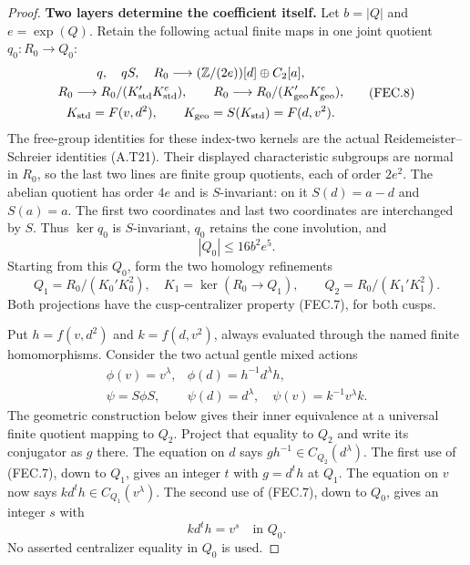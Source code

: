 \begin{proof}
\par\medskip\noindent\textbf{Two layers determine the coefficient itself.}\quad
Let $b=|Q|$ and $e=\exp(Q)$.  Retain the following actual
finite maps in one joint quotient $q_0:R_0\to Q_0$:
\[
 \begin{gathered}
 q,\quad qS,\quad
 R_0\longrightarrow(\mathbb Z/(2e))[d]\oplus C_2[a],\\
 R_0\longrightarrow R_0/(K_{\rm std}'K_{\rm std}^{e}),\qquad
 R_0\longrightarrow R_0/(K_{\rm geo}'K_{\rm geo}^{e}),\\
 K_{\rm std}=F(v,d^2),\qquad K_{\rm geo}=S(K_{\rm std})=F(d,v^2).
 \end{gathered}
                                                               \tag{FEC.8}
\]
The free-group identities for these index-two kernels
are the actual Reidemeister--Schreier identities (A.T21).
Their displayed characteristic subgroups are normal in
$R_0$, so the last two lines are finite group quotients,
each of order $2e^2$.  The abelian quotient has order
$4e$ and is $S$-invariant: on it $S(d)=a-d$ and $S(a)=a$.
The first two coordinates and last two coordinates are
interchanged by $S$.  Thus $\ker q_0$ is $S$-invariant,
$q_0$ retains the cone involution, and
\[
                         |Q_0|\leq16b^2e^5.
                                                               \tag{FEC.9}
\]
Starting from this $Q_0$, form the two homology refinements
\[
 Q_1=R_0/(K_0'K_0^2),\quad K_1=\ker(R_0\to Q_1),
 \qquad Q_2=R_0/(K_1'K_1^2).
                                                               \tag{FEC.10}
\]
Both projections have the cusp-centralizer property
(FEC.7), for both cusps.

Put $h=f(v,d^2)$ and $k=f(d,v^2)$, always evaluated
through the named finite homomorphisms.  Consider the
two actual gentle mixed actions
\[
 \begin{array}{ll}
 \phi(v)=v^\lambda,&\phi(d)=h^{-1}d^\lambda h,\\
 \psi=S\phi S,&
 \psi(d)=d^\lambda,\quad\psi(v)=k^{-1}v^\lambda k.
 \end{array}
                                                               \tag{FEC.11}
\]
The geometric construction below gives their inner
equivalence at a universal finite quotient mapping to
$Q_2$.  Project that equality to $Q_2$ and write its
conjugator as $g$ there.  The equation on $d$ says
$gh^{-1}\in C_{Q_2}(d^\lambda)$.  The first use of
(FEC.7), down to $Q_1$, gives an integer $t$ with
$g=d^th$ at $Q_1$.  The equation on $v$ now says
$kd^th\in C_{Q_1}(v^\lambda)$.  The second use of
(FEC.7), down to $Q_0$, gives an integer $s$ with
\[
                         kd^th=v^s\quad\text{in }Q_0.
                                                               \tag{FEC.12}
\]
No asserted centralizer equality in $Q_0$ is used.


\end{proof}
